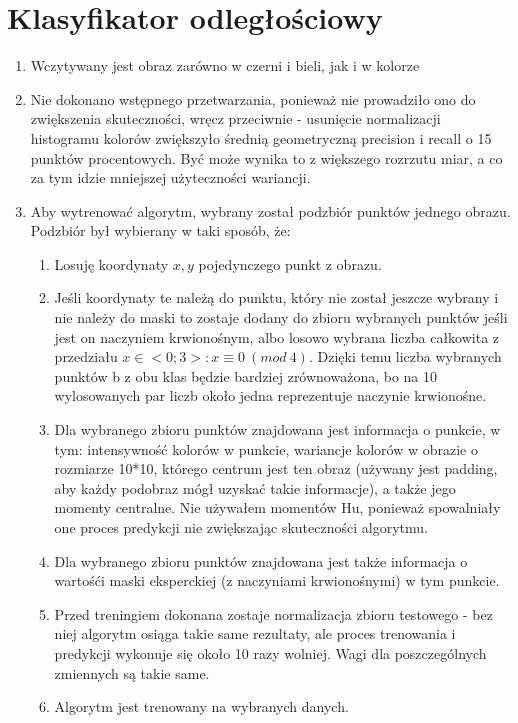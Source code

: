 \documentclass[12pt]{article}
\begin{document}
\section{Klasyfikator odległościowy}
\begin{enumerate}
	\item Wczytywany jest obraz zarówno w czerni i bieli, jak i w kolorze
	\item Nie dokonano wstępnego przetwarzania, ponieważ nie prowadziło ono do zwiększenia skuteczności, wręcz przeciwnie - usunięcie normalizacji histogramu kolorów zwiększyło średnią geometryczną precision i recall o 15 punktów procentowych. Być może wynika to z większego rozrzutu miar, a co za tym idzie mniejszej użyteczności wariancji.
	\item Aby wytrenować algorytm, wybrany został podzbiór punktów jednego obrazu. Podzbiór był wybierany w taki sposób, że:
	\begin{enumerate}
		\item Losuję koordynaty \(x, y\) pojedynczego punkt z obrazu.
		\item Jeśli koordynaty te należą do punktu, który nie został jeszcze wybrany i nie należy do maski to zostaje dodany do zbioru wybranych punktów jeśli jest on naczyniem krwionośnym, albo losowo wybrana liczba całkowita z przedziału \(x \in <0;3>: x \equiv 0\ (mod\ 4)\). Dzięki temu liczba wybranych punktów b z obu klas będzie bardziej zrównoważona, bo na 10 wylosowanych par liczb około jedna reprezentuje naczynie krwionośne.
		\item Dla wybranego zbioru punktów znajdowana jest informacja o punkcie, w tym: intensywność kolorów w punkcie, wariancje kolorów w obrazie o rozmiarze 10*10, którego centrum jest ten obraz (używany jest padding, aby każdy podobraz mógł uzyskać takie informacje), a także jego momenty centralne. Nie używałem momentów Hu, ponieważ spowalniały one proces predykcji nie zwiększając skuteczności algorytmu.
		\item Dla wybranego zbioru punktów znajdowana jest także informacja o wartośći maski eksperckiej (z naczyniami krwionośnymi) w tym punkcie.
		\item Przed treningiem dokonana zostaje normalizacja zbioru testowego - bez niej algorytm osiąga takie same rezultaty, ale proces trenowania i predykcji wykonuje się około 10 razy wolniej. Wagi dla poszczególnych zmiennych są takie same.
		\item Algorytm jest trenowany na wybranych danych.
	\end{enumerate}
\end{enumerate}
\end{document}
